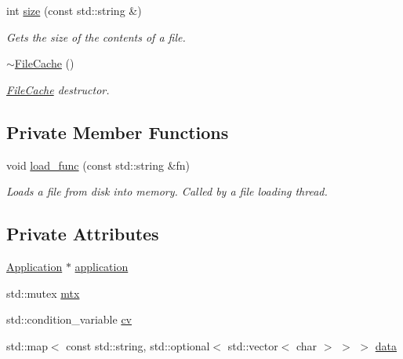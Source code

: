 \begin{DoxyCompactItemize}
int \mbox{\hyperlink{classsage_1_1FileCache_a369b86f1fb585e5ce5142a7f1f22e38c}{size}} (const std\+::string \&)
\begin{DoxyCompactList}\small\item\em Gets the size of the contents of a file. \end{DoxyCompactList}\item 
\mbox{\hyperlink{classsage_1_1FileCache_a07c4e05a6d3d792685b48fba44142e08}{$\sim$\+File\+Cache}} ()
\begin{DoxyCompactList}\small\item\em \mbox{\hyperlink{classsage_1_1FileCache}{File\+Cache}} destructor. \end{DoxyCompactList}\end{DoxyCompactItemize}
\subsection*{Private Member Functions}
\begin{DoxyCompactItemize}
\item 
void \mbox{\hyperlink{classsage_1_1FileCache_a991e5569482a4f6f864dd9854c4524d0}{load\+\_\+func}} (const std\+::string \&fn)
\begin{DoxyCompactList}\small\item\em Loads a file from disk into memory. Called by a file loading thread. \end{DoxyCompactList}\end{DoxyCompactItemize}
\subsection*{Private Attributes}
\begin{DoxyCompactItemize}
\item 
\mbox{\hyperlink{classsage_1_1Application}{Application}} $\ast$ \mbox{\hyperlink{classsage_1_1FileCache_a4ff6c40a790b7e9ed42c05a7dd426872}{application}}
\item 
std\+::mutex \mbox{\hyperlink{classsage_1_1FileCache_a1bbc9aebae036d04a6eef1f74d535d5a}{mtx}}
\item 
std\+::condition\+\_\+variable \mbox{\hyperlink{classsage_1_1FileCache_ac6f227036472f8b5b5265d3126f992ae}{cv}}
\item 
std\+::map$<$ const std\+::string, std\+::optional$<$ std\+::vector$<$ char $>$ $>$ $>$ \mbox{\hyperlink{classsage_1_1FileCache_ac3d22a89c9d2ab8aa2af4949002a8df4}{data}}
\end{DoxyCompactItemize}


